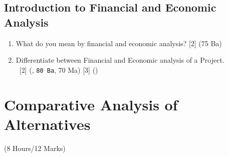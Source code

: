 \documentclass[12pt]{article}
\newcommand{\enter}{\\\textcolor{white}{1}}
\begin{document}
	\subsection{Introduction to Financial and Economic Analysis}
	\begin{enumerate}[noitemsep, topsep = 0pt]
		\item What do you mean by financial and economic analysis? \hfill [2] (75 Ba)

		\item Differentiate between Financial and Economic analysis of a Project.
		\enter\hfill [2] (, \texttt{80 Ba}, 70 Ma) [3] ()
	\end{enumerate}

	\pagebreak
\section{Comparative Analysis of Alternatives}
	\begin{center}(8 Hours/12 Marks)\end{center}
\end{document}
